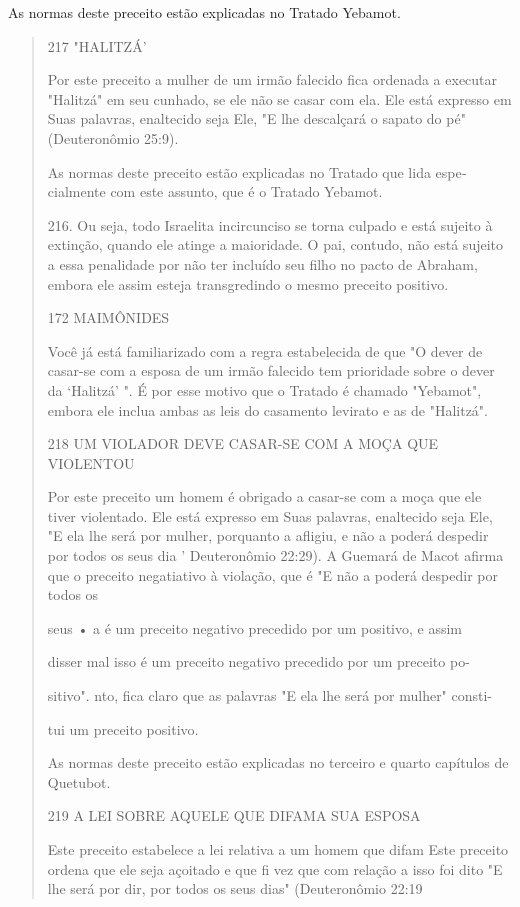 As normas deste preceito estão explicadas no Tratado Yebamot.

\begin{quote}
217 "HALITZÁ'

Por este preceito a mulher de um irmão falecido fica ordenada a
exe­cutar "Halitzá" em seu cunhado, se ele não se casar com ela. Ele
está expresso em Suas palavras, enaltecido seja Ele, "E lhe descalçará o
sapato do pé" (Deute­ronômio 25:9).

As normas deste preceito estão explicadas no Tratado que lida
espe­cialmente com este assunto, que é o Tratado Yebamot.

216. Ou seja, todo Israelita incircunciso se torna culpado e está
sujeito à extinção, quando ele atin­ge a maioridade. O pai, contudo, não
está sujeito a essa penalidade por não ter incluído seu filho no pacto
de Abraham, embora ele assim esteja transgredindo o mesmo preceito
positivo.

172 MAIMÔNIDES

Você já está familiarizado com a regra estabelecida de que "O dever de
casar-se com a esposa de um irmão falecido tem prioridade sobre o dever
da `Halitzá' ". É por esse motivo que o Tratado é chamado "Yebamot",
embo­ra ele inclua ambas as leis do casamento levirato e as de
"Halitzá".

218 UM VIOLADOR DEVE CASAR-SE COM A MOÇA QUE VIOLENTOU

Por este preceito um homem é obrigado a casar-se com a moça que ele
tiver violentado. Ele está expresso em Suas palavras, enaltecido seja
Ele, "E ela lhe será por mulher, porquanto a afligiu, e não a poderá
despedir por todos os seus dia ' Deuteronômio 22:29). A Guemará de Macot
afirma que o precei­to negatiativo à violação, que é "E não a poderá
despedir por todos os

seus • a é um preceito negativo precedido por um positivo, e assim

disser mal isso é um preceito negativo precedido por um preceito po-

sitivo". nto, fica claro que as palavras "E ela lhe será por mulher"
consti-

tui um preceito positivo.

As normas deste preceito estão explicadas no terceiro e quarto
capí­tulos de Quetubot.

219 A LEI SOBRE AQUELE QUE DIFAMA SUA ESPOSA

Este preceito estabelece a lei relativa a um homem que difam Este
preceito ordena que ele seja açoitado e que fi vez que com relação a
isso foi dito "E lhe será por dir, por todos os seus dias" (Deuteronômio
22:19


\end{quote}
